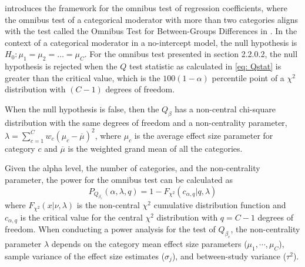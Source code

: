 \textcite{hedges2004} introduces the framework for the omnibus test of regression coefficients, where the omnibus test of a categorical moderator with more than two categories aligns with the test called the Omnibus Test for Between-Groups Differences in \textcite{hedges2004}. In the context of a categorical moderator in a no-intercept model, the null hypothesis is $H_0: \mu_{1} = \mu_{2} = \hdots = \mu_{C}$. For the omnibus test presented in section 2.2.0.2, the null hypothesis is rejected when the $Q$ test statistic as calculated in \ref{eq: Qstat} is greater than the critical value, which is the $100(1-\alpha)$ percentile point of a $\chi^2$ distribution with $(C-1)$ degrees of freedom. 

When the null hypothesis is false, then the $Q_{\beta}$ has a non-central chi-square distribution with the same degrees of freedom and a non-centrality parameter, $\lambda = \sum_{c=1}^C w_c(\mu_{c} - \overline{\mu})^2$, where $\mu_{c}$ is the average effect size parameter for category $c$ and $ \overline{\mu}$ is the weighted grand mean of all the categories. 



Given the alpha level, the number of categories, and the non-centrality parameter, the power for the omnibus test can be calculated as
\begin{equation}
    P_{Q_{\beta_c}}(\alpha, \lambda, q) = 1 - F_{\chi^2} (c_{\alpha, q} | q , \lambda)
\end{equation}
where $F_{\chi^2}(x|\nu, \lambda)$ is the non-central $\chi^2$ cumulative distribution function and $c_{\alpha,q}$ is the critical value for the central $\chi^2$ distribution with $q = C - 1$ degrees of freedom. When conducting a power analysis for the test of $Q_{\beta_c}$, the non-centrality parameter $\lambda$ depends on the category mean effect size parameters ($\mu_1, \cdots, \mu_C$), sample variance of the effect size estimates ($\sigma_j$), and between-study variance ($\tau^2$). 

